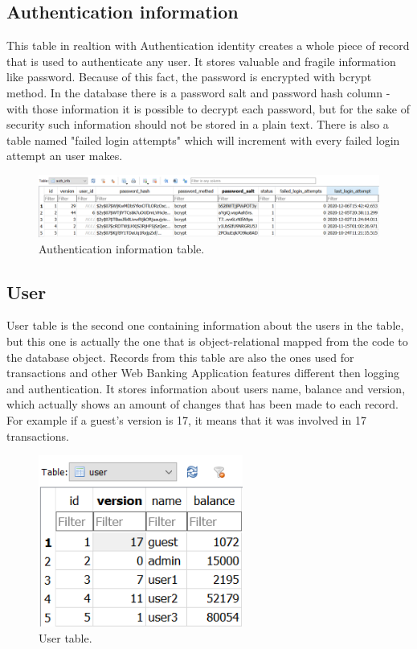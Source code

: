 \documentclass[a4paper,12pt]{book}
\begin{document}
\subsection*{Authentication information}
{
This table in realtion with Authentication identity creates a whole piece of record that is used to authenticate any user. It stores valuable and fragile information like password. Because of this fact, the password is encrypted with bcrypt method. In the database there is a password salt and password hash column - with those information it is possible to decrypt each password, but for the sake of security such information should not be stored in a plain text. There is also a table named "failed login attempts" which will increment with every failed login attempt an user makes.

\begin{figure}[H]
\centering
\includegraphics[width=1.0\textwidth]{auth_info}
\caption{Authentication information table.}
\end{figure}

}

\subsection*{User}
{
User table is the second one containing information about the users in the table, but this one is actually the one that is object-relational mapped from the code to the database object. Records from this table are also the ones used for transactions and other Web Banking Application features different then logging and authentication. It stores information about users name, balance and version, which actually shows an amount of changes that has been made to each record. For example if a guest's version is 17, it means that it was involved in 17 transactions.

\begin{figure}[H]
\centering
\includegraphics[width=0.6\textwidth]{user}
\caption{User table.}
\end{figure}
}
\end{document}
